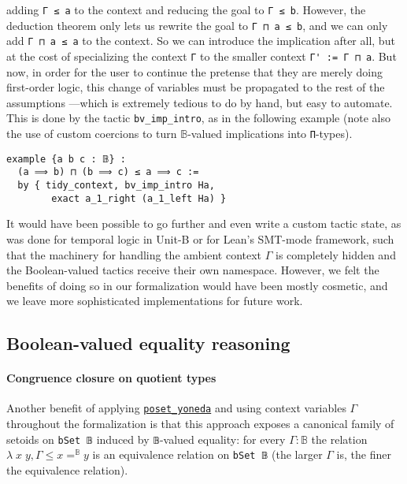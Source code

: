 \documentclass[sigplan,10pt,review, anonymous]{acmart}
\newcommand{\B}{\mathbb{B}}
\newcommand{\lil}{\lstinline}
\theoremstyle{definition}
\begin{document}
adding \lstinline{Γ ≤ a} to the context and reducing the goal to \lstinline{Γ ≤ b}. However, the deduction theorem only lets us rewrite the goal to \lstinline{Γ ⊓ a ≤ b}, and we can only add \lstinline{Γ ⊓ a ≤ a} to the context.
So we can introduce the implication after all, but at the cost of specializing the context \lstinline{Γ} to the smaller context \lstinline{Γ' := Γ ⊓ a}.
But now, in order for the user to continue the pretense that they are merely doing first-order logic, this change of variables must be propagated to the rest of the assumptions%
---which is extremely tedious to do by hand, but easy to automate.
This is done by the tactic \lil{bv_imp_intro}, as in the following example (note also the use of custom coercions to turn \(\B\)-valued implications into \lil{Π}-types).
\begin{lstlisting}
example {a b c : 𝔹} :
  (a ⟹ b) ⊓ (b ⟹ c) ≤ a ⟹ c :=
  by { tidy_context, bv_imp_intro Ha,
        exact a_1_right (a_1_left Ha) }
\end{lstlisting}

It would have been possible to go further and even write a custom tactic state,
as was done for temporal logic in Unit-B \cite{Hudon2015TheUM} or for Lean's SMT-mode framework,
such that the machinery for handling the ambient context \(\Gamma\) is completely hidden and the Boolean-valued tactics receive their own namespace.
However, we felt the benefits of doing so in our formalization would have been mostly cosmetic, and we leave more sophisticated implementations for future work.

\subsection{Boolean-valued equality reasoning}

\paragraph{Congruence closure on quotient types} \label{subsect:bv-cc}
Another benefit of applying \hyperref[poset-yoneda]{\lstinline{poset_yoneda}} and using context variables \(\Gamma\) throughout the formalization is that this approach exposes a canonical family of setoids on \lil{bSet 𝔹} induced by \lil{𝔹}-valued equality:
for every \(\Gamma : \mathbb{B}\) the relation \(\lambda\; x \; y, \Gamma \leq x =^{\mathbb{B}} y\) is an equivalence relation on \lil{bSet 𝔹} (the larger \(\Gamma\) is, the finer the equivalence relation).
\end{document}
